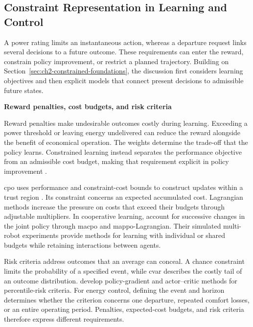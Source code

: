 \subsection{Constraint Representation in Learning and Control}
\label{sec:ch3-constraint-representation}

A power rating limits an instantaneous action, whereas a departure request links several decisions to a future outcome. These requirements can enter the reward, constrain policy improvement, or restrict a planned trajectory. Building on Section~\ref{sec:ch2-constrained-foundations}, the discussion first considers learning objectives and then explicit models that connect present decisions to admissible future states.

\smallskip
\noindent\textbf{Reward penalties, cost budgets, and risk criteria}\par\nobreak\smallskip
Reward penalties make undesirable outcomes costly during learning. Exceeding a power threshold or leaving energy undelivered can reduce the reward alongside the benefit of economical operation. The weights determine the trade-off that the policy learns. Constrained learning instead separates the performance objective from an admissible cost budget, making that requirement explicit in policy improvement \parencite{achiam2017cpo,gu2023safemarl}.

\gls{cpo} uses performance and constraint-cost bounds to construct updates within a trust region \parencite{achiam2017cpo}. Its constraint concerns an expected accumulated cost. Lagrangian methods increase the pressure on costs that exceed their budgets through adjustable multipliers. In cooperative learning, \textcite{gu2023safemarl} account for successive changes in the joint policy through \gls{macpo} and \gls{mappo}-Lagrangian. Their simulated multi-robot experiments provide methods for learning with individual or shared budgets while retaining interactions between agents.

Risk criteria address outcomes that an average can conceal. A chance constraint limits the probability of a specified event, while \gls{cvar} describes the costly tail of an outcome distribution. \textcite{chow2018risk} develop policy-gradient and actor--critic methods for percentile-risk criteria. For energy control, defining the event and horizon determines whether the criterion concerns one departure, repeated comfort losses, or an entire operating period. Penalties, expected-cost budgets, and risk criteria therefore express different requirements.

